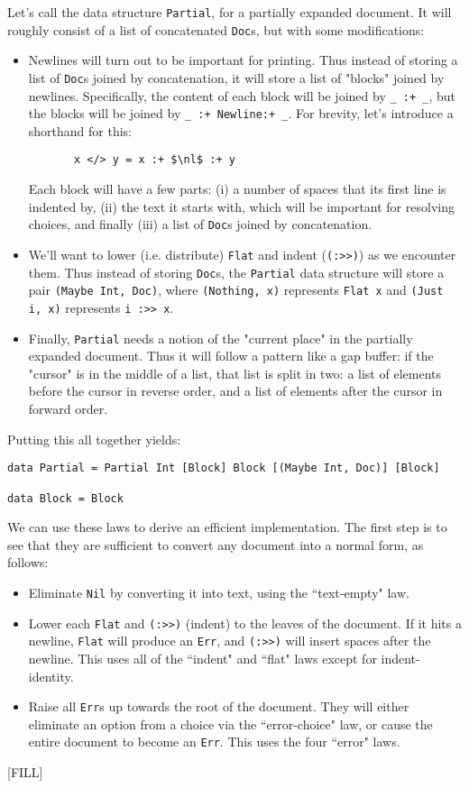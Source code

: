 \documentclass{article}
\newcommand{\nl}{\texttt{Newline}}
\newcommand{\code}[1]{\texttt{#1}}
\begin{document}
Let's call the data structure \code{Partial}, for a partially expanded document. It will roughly
consist of a list of concatenated \code{Doc}s, but with some modifications:
\begin{itemize}
  \item Newlines will turn out to be important for printing. Thus instead of storing a list of
    \code{Doc}s joined by concatenation, it will store a list of "blocks" joined by newlines.
    Specifically, the content of each block will be joined by \code{\_ :+ \_}, but the blocks will
    be joined by \code{\_ :+ \nl :+ \_}. For brevity, let's introduce a shorthand for this:
    \begin{lstlisting}
       x </> y = x :+ $\nl$ :+ y
    \end{lstlisting}
    Each block will have a few parts: (i) a number of spaces that its first line is indented by,
    (ii) the text it starts with, which will be important for resolving choices, and finally (iii)
    a list of \code{Doc}s joined by concatenation.
  \item We'll want to lower (i.e. distribute) \code{Flat} and indent (\code{(:>>)}) as we encounter
    them. Thus instead of storing \code{Doc}s, the \code{Partial} data structure will store a pair
    \code{(Maybe Int, Doc)}, where \code{(Nothing, x)} represents \code{Flat x} and \code{(Just i,
    x)} represents \code{i :>> x}.
  \item Finally, \code{Partial} needs a notion of the "current place" in the partially expanded
    document. Thus it will follow a pattern like a gap buffer: if the "cursor" is in the middle of a
    list, that list is split in two: a list of elements before the cursor in reverse order, and a
    list of elements after the cursor in forward order.
\end{itemize}

Putting this all together yields:
\begin{lstlisting}
data Partial = Partial Int [Block] Block [(Maybe Int, Doc)] [Block]

data Block = Block 
\end{lstlisting}

We can use these laws to derive an efficient implementation. The first step is to see that they are
sufficient to convert any document into a normal form, as follows:

\begin{itemize}
\item Eliminate \code{Nil} by converting it into text, using the ``text-empty" law.
\item Lower each \code{Flat} and \code{(:>>)} (indent) to the leaves of the document. If it hits a
newline, \code{Flat} will produce an \code{Err}, and \code{(:>>)} will insert spaces after the
newline. This uses all of the ``indent" and ``flat" laws except for indent-identity.
\item Raise all \code{Err}s up towards the root of the document. They will either eliminate an
option from a choice via the ``error-choice" law, or cause the entire document to become an
\code{Err}. This uses the four ``error" laws.
\end{itemize}

[FILL]
\end{document}
